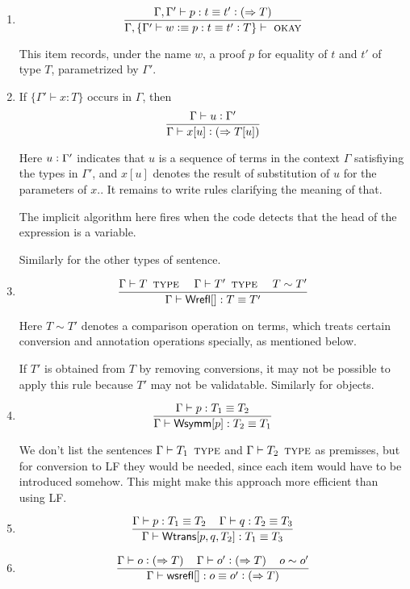 \documentclass[11pt]{article}
\newcommand{\eqd}{\equiv}
\newcommand{\spc}{{\,\,\,\,\,\,\,}}
\newcommand{\ccolon}[1]{\vcentcolon#1}
\newcommand{\synth}[1]{\vcentcolon(\Rightarrow#1)} %
\newcommand{\ccheck}[1]{\vcentcolon#1}  %
\newcommand{\Type}{\mathop{\text{ \sc type}}}
\newcommand{\Okay}{\mathop{\text{ \sc okay}}}
\newcommand{\ha}[2]{#1[#2]}
\newcommand{\Wrefl}{{\sf Wrefl}}
\newcommand{\Wtrans}{{\sf Wtrans}}
\newcommand{\Wsymm}{{\sf Wsymm}}
\newcommand{\wsrefl}{{\sf wsrefl}}
\newcommand{\defn}{\vcentcolon\equiv}
\begin{document}
\begin{enumerate}
This item introduces an axiom asserting equality of $t$ and $t'$ under the name $w$.

\item
$$\frac{\Gamma,\Gamma'\vdash p : t \eqd t' \synth{T} }{\Gamma,\{\Gamma' \vdash w \defn p : t \eqd t' \ccolon{T} \} \vdash\Okay}$$

This item records, under the name $w$, a proof $p$ for equality of $t$ and $t'$ of type $T$, parametrized by $\Gamma'$.

\item 
If $\{ \Gamma' \vdash x : T \}$ occurs in $\Gamma$, then
$$\frac{\Gamma\vdash u \ccheck \Gamma'}{\Gamma\vdash x[u] \synth{T[u]}}$$

Here $u \ccheck \Gamma'$ indicates that $u$ is a sequence of terms in the
context $\Gamma$ satisfiying the types in $\Gamma'$, and $x[u]$ denotes the
result of substitution of $u$ for the parameters of $x$..  It remains to write
rules clarifying the meaning of that.

The implicit algorithm here fires when the code detects that the head of the
expression is a variable.

Similarly for the other types of sentence.

\item 
$$\frac{\Gamma \vdash T \Type\spc \Gamma \vdash T'\Type \spc T\sim T'}{\Gamma\vdash \ha\Wrefl{}: T\eqd T'}$$

Here $T\sim T'$ denotes a comparison operation on terms, which treats certain
conversion and annotation operations specially, as mentioned below.

If $T'$ is obtained from $T$ by removing conversions, it may not be possible to apply
this rule because $T'$ may not be validatable.  Similarly for objects.

\item 
$$\frac{\Gamma\vdash p:T_1\eqd T_2}{\Gamma\vdash \ha\Wsymm{p}:T_2\eqd T_1}$$

We don't list the sentences $ \Gamma \vdash T_1 \Type $ and $ \Gamma \vdash T_2
\Type $ as premisses, but for conversion to LF they would be needed, since each
item would have to be introduced somehow.  This might make this approach more
efficient than using LF.

\item 
$$\frac{\Gamma\vdash p:T_1\eqd T_2\spc\Gamma\vdash q:T_2\eqd T_3}{\Gamma\vdash \ha\Wtrans{p,q,T_2}: T_1\eqd T_3}$$

\item 
$$\frac{\Gamma\vdash o \synth{T}\spc\Gamma\vdash o' \synth{T} \spc o \sim o'}{\Gamma\vdash \ha\wsrefl{}:o\eqd o' \synth{T}}$$


\end{enumerate}
\end{document}
